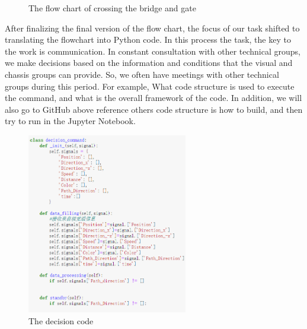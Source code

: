 \begin{figure}[htbp]
    \centering
    \caption{The flow chart of crossing the bridge and gate}
    \label{fig:cross_bridge_gate}
\end{figure}
After finalizing the final version of the flow chart, the focus of our task shifted to translating the flowchart into Python code. In this process the task, the key to the work is communication. In constant consultation with other technical groups, we make decisions based on the information and conditions that the visual and chassis groups can provide. So, we often have meetings with other technical groups during this period. For example, What code structure is used to execute the command, and what is the overall framework of the code. In addition, we will also go to GitHub above reference others code structure is how to build, and then try to run in the Jupyter Notebook.

\begin{figure}[htbp]
    \centering
    \includegraphics[width=7cm]{implementation/img_xu/decision_code.png}
    \caption{The decision code}
    \label{fig:decision_code}
\end{figure}
